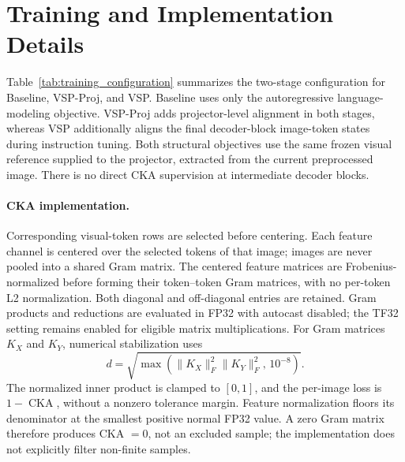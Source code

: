 \section{Training and Implementation Details}
\label{app:training_details}

Table~\ref{tab:training_configuration} summarizes the two-stage configuration
for Baseline, VSP-Proj, and VSP. Baseline uses only the autoregressive
language-modeling objective. VSP-Proj adds projector-level alignment in both
stages, whereas VSP additionally aligns the final decoder-block image-token
states during instruction tuning. Both structural objectives use the same
frozen visual reference supplied to the projector, extracted from the current
preprocessed image. There is no direct CKA supervision at intermediate decoder
blocks.



\paragraph{CKA implementation.}
Corresponding visual-token rows are selected before centering. Each feature
channel is centered over the selected tokens of that image; images are never
pooled into a shared Gram matrix. The centered feature matrices are
Frobenius-normalized before forming their token--token Gram matrices, with no
per-token L2 normalization. Both diagonal and off-diagonal entries are retained.
Gram products and reductions are evaluated in FP32 with autocast disabled;
the TF32 setting remains enabled for eligible matrix multiplications.
For Gram matrices $K_X$ and $K_Y$, numerical stabilization uses
\begin{equation}
    d=\sqrt{\max\!\left(
        \lVert K_X\rVert_F^2\lVert K_Y\rVert_F^2,\,10^{-8}
    \right)}.
\end{equation}
The normalized inner product is clamped to $[0,1]$, and the per-image loss is
$1-\operatorname{CKA}$, without a nonzero tolerance margin. Feature normalization
floors its denominator at the smallest positive normal FP32 value. A zero Gram
matrix therefore produces CKA $=0$, not an excluded sample; the implementation
does not explicitly filter non-finite samples.

